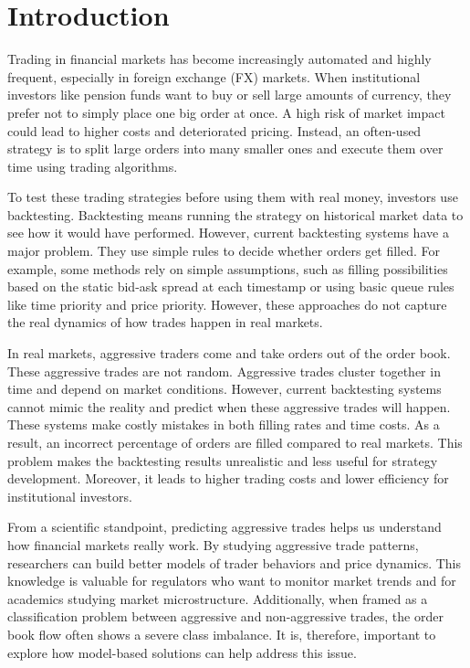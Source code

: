 \chapter{Introduction}\label{chapter:introduction}
Trading in financial markets has become increasingly automated and highly frequent, especially in foreign exchange (FX) markets. When institutional investors like pension funds want to buy or sell large amounts of currency, they prefer not to simply place one big order at once. A high risk of market impact could lead to higher costs and deteriorated pricing. Instead, an often-used strategy is to split large orders into many smaller ones and execute them over time using trading algorithms. 

To test these trading strategies before using them with real money, investors use backtesting. Backtesting means running the strategy on historical market data to see how it would have performed. However, current backtesting systems have a major problem. They use simple rules to decide whether orders get filled. For example, some methods rely on simple assumptions, such as filling possibilities based on the static bid-ask spread at each timestamp or using basic queue rules like time priority and price priority. However, these approaches do not capture the real dynamics of how trades happen in real markets.

In real markets, aggressive traders come and take orders out of the order book. These aggressive trades are not random. Aggressive trades cluster together in time and depend on market conditions. However, current backtesting systems cannot mimic the reality and predict when these aggressive trades will happen. These systems make costly mistakes in both filling rates and time costs. As a result, an incorrect percentage of orders are filled compared to real markets. This problem makes the backtesting results unrealistic and less useful for strategy development. Moreover, it leads to higher trading costs and lower efficiency for institutional investors. 

From a scientific standpoint, predicting aggressive trades helps us understand how financial markets really work. By studying aggressive trade patterns, researchers can build better models of trader behaviors and price dynamics. This knowledge is valuable for regulators who want to monitor market trends and for academics studying market microstructure. Additionally, when framed as a classification problem between aggressive and non-aggressive trades, the order book flow often shows a severe class imbalance. It is, therefore, important to explore how model-based solutions can help address this issue. 

